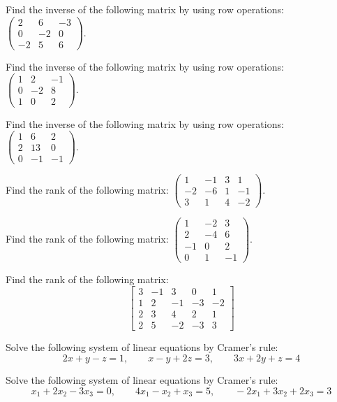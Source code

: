 \documentclass[11pt,a4paper]{article}
\begin{document}
\begin{longlist}
\item Find the inverse of the following matrix by using row operations: $\begin{pmatrix}2 & 6 & -3\\ 0 & -2 & 0\\ -2 & 5 & 6\end{pmatrix}$.

\item Find the inverse of the following matrix by using row operations: $\begin{pmatrix}1 & 2 & -1\\ 0 & -2 & 8\\ 1 & 0 & 2\end{pmatrix}$.

\item Find the inverse of the following matrix by using row operations: $\begin{pmatrix}1 & 6 & 2\\ 2 & 13 & 0\\ 0 & -1 & -1\end{pmatrix}$.

\item Find the rank of the following matrix: $\begin{pmatrix}1 & -1 & 3 & 1\\ -2 & -6 & 1 & -1\\ 3 & 1 & 4 & -2\end{pmatrix}$.

\item Find the rank of the following matrix: $\begin{pmatrix}1 & -2 & 3\\ 2 & -4 & 6\\ -1 & 0 & 2\\ 0 & 1 & -1\end{pmatrix}$.

\item Find the rank of the following matrix:
\[
\begin{bmatrix} 3 & -1 & 3 & 0 & 1 \\ 1 & 2 & -1 & -3 & -2 \\ 2 & 3 & 4 & 2 & 1 \\ 2 & 5 & -2 & -3 & 3 \end{bmatrix}
\]

\item Solve the following system of linear equations by Cramer's rule:
\[
2x+y-z=1, \qquad x-y+2z=3, \qquad 3x+2y+z=4
\]

\item Solve the following system of linear equations by Cramer's rule:
\[
x_1+2x_2-3x_3=0, \qquad 4x_1-x_2+x_3=5, \qquad -2x_1+3x_2+2x_3=3
\]


\end{longlist}
\end{document}

